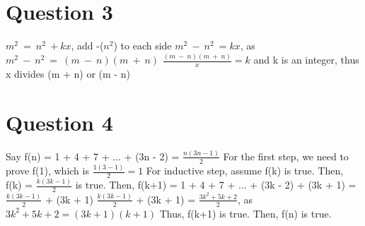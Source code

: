 \documentclass[12pt]{article}
\begin{document}
\section*{Question 3}
$m^2\:=\:n^2\:+kx$, add -($n^2$) to each side \newline
$m^2\:-\:n^2\:=kx$, as $m^2\:-\:n^2\:=\:(m\:-\:n)(m\:+\:n)$ \newline
$\frac{(m\:-\:n)(m\:+\:n)}{x} = k$ and k is an integer, thus x divides (m + n) or (m - n)

\section*{Question 4}
Say f(n) = 1 + 4 + 7 + ... + (3n - 2) = $\frac{n(3n - 1)}{2}$\newline
For the first step, we need to prove f(1), which is $\frac{1(3-1)}{2} = 1$\newline 
For inductive step, assume f(k) is true. Then, f(k) = $\frac{k(3k-1)}{2}$ is true. \newline
Then, f(k+1) = 1 + 4 + 7 + ... + (3k - 2) + (3k + 1) = $\frac{k(3k-1)}{2}$ + (3k + 1) \newline
$\frac{k(3k-1)}{2}$ + (3k + 1) = $\frac{3k^2+5k+2}{2}$, as $3k^2+5k+2 = (3k + 1)(k + 1)$ \newline
Thus, f(k+1) is true. Then, f(n) is true.
\end{document}
